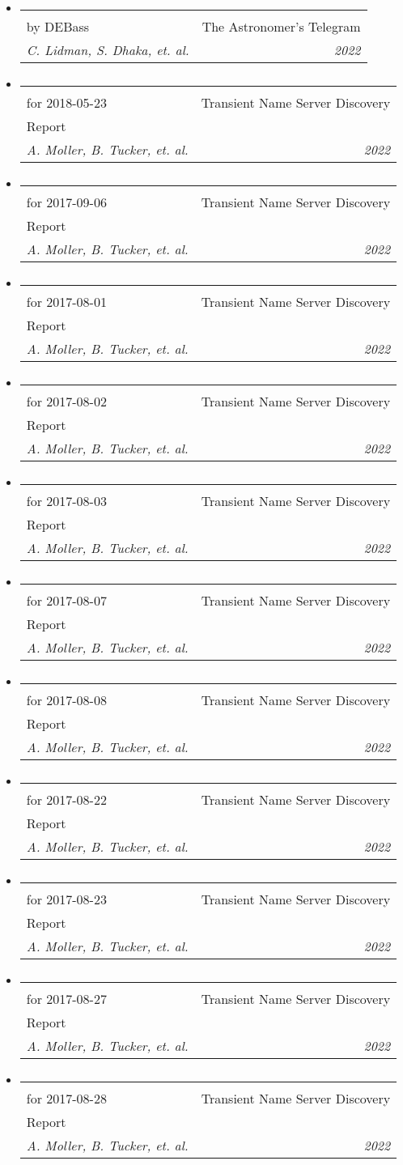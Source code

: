 \documentclass[letterpaper,11pt]{article}
\makeatletter
\newcommand{\resumeItem}[1]{
  \item\small{
    {#1 \vspace{-2pt}}
  }
}
\newcommand{\resumeSubheading}[4]{
  \vspace{-2pt}\item
    \begin{tabular*}{0.97\textwidth}[t]{l@{\extracolsep{\fill}}r}
      \textbf{#1} & #2 \\
      \textit{\small#3} & \textit{\small #4} \\
    \end{tabular*}\vspace{-7pt}
}
\newcommand{\resumeSubHeadingListStart}{\begin{itemize}[leftmargin=0.15in, label={}]}
\newcommand{\resumeSubHeadingListEnd}{\end{itemize}}
\newcommand{\resumeItemListStart}{\begin{itemize}}
\newcommand{\resumeItemListEnd}{\end{itemize}\vspace{-5pt}}
\newcommand{\publicationElement}[5]{%
    \resumeSubHeadingListStart
        \resumeSubheading
            {#1}
            {#2}
            {#3}
            {#4}
            \ifthenelse{\isempty{#5}}{}{%
                \resumeItemListStart
                    \renewcommand*{\do}[1]{\resumeItem{##1}}
                    \docsvlist{#5}%
                \resumeItemListEnd
            }%
    \resumeSubHeadingListEnd
}
\makeatother
\begin{document}
        \publicationElement{Classification of 11 supernovae\\by DEBass}{The Astronomer's Telegram}{C. Lidman, S. Dhaka, et. al.}{2022}{}
        \publicationElement{SkyMapper Transient Discovery Report\\for 2018-05-23}{Transient Name Server Discovery\\Report}{A. Moller, B. Tucker, et. al.}{2022}{}
        \publicationElement{SkyMapper Transient Discovery Report\\for 2017-09-06}{Transient Name Server Discovery\\Report}{A. Moller, B. Tucker, et. al.}{2022}{}
        \publicationElement{SkyMapper Transient Discovery Report\\for 2017-08-01}{Transient Name Server Discovery\\Report}{A. Moller, B. Tucker, et. al.}{2022}{}
        \publicationElement{SkyMapper Transient Discovery Report\\for 2017-08-02}{Transient Name Server Discovery\\Report}{A. Moller, B. Tucker, et. al.}{2022}{}
        \publicationElement{SkyMapper Transient Discovery Report\\for 2017-08-03}{Transient Name Server Discovery\\Report}{A. Moller, B. Tucker, et. al.}{2022}{}
        \publicationElement{SkyMapper Transient Discovery Report\\for 2017-08-07}{Transient Name Server Discovery\\Report}{A. Moller, B. Tucker, et. al.}{2022}{}
        \publicationElement{SkyMapper Transient Discovery Report\\for 2017-08-08}{Transient Name Server Discovery\\Report}{A. Moller, B. Tucker, et. al.}{2022}{}
        \publicationElement{SkyMapper Transient Discovery Report\\for 2017-08-22}{Transient Name Server Discovery\\Report}{A. Moller, B. Tucker, et. al.}{2022}{}
        \publicationElement{SkyMapper Transient Discovery Report\\for 2017-08-23}{Transient Name Server Discovery\\Report}{A. Moller, B. Tucker, et. al.}{2022}{}
        \publicationElement{SkyMapper Transient Discovery Report\\for 2017-08-27}{Transient Name Server Discovery\\Report}{A. Moller, B. Tucker, et. al.}{2022}{}
        \publicationElement{SkyMapper Transient Discovery Report\\for 2017-08-28}{Transient Name Server Discovery\\Report}{A. Moller, B. Tucker, et. al.}{2022}{}
\end{document}
